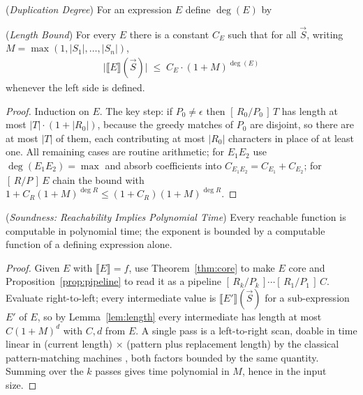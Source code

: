 \documentclass[runningheads,envcountsect]{llncs}
\begin{document}
\begin{definition}
    (\emph{Duplication Degree})
    \label{def:deg}
    For an expression $E$ define $\deg(E)$ by
\end{definition}

\begin{lemma}
    (\emph{Length Bound})
    \label{lem:length}
    For every $E$ there is a constant $C_E$ such that for all $\vec S$, writing $M = \max(1, |S_1|, \dots, |S_n|)$,
    \begin{align}
        \big|\llbracket E \rrbracket(\vec S)\big| \;\le\; C_E \cdot (1+M)^{\deg(E)}
    \end{align}
    whenever the left side is defined.
\end{lemma}

\begin{proof}
    Induction on $E$. The key step: if $P_0 \neq \epsilon$ then $[\,R_0/P_0\,]\,T$ has length at most $|T| \cdot (1 + |R_0|)$, because the greedy matches of $P_0$ are disjoint, so there are at most $|T|$ of them, each contributing at most $|R_0|$ characters in place of at least one. All remaining cases are routine arithmetic; for $E_1E_2$ use $\deg(E_1E_2) = \max$ and absorb coefficients into $C_{E_1E_2} = C_{E_1} + C_{E_2}$; for $[\,R/P\,]\,E$ chain the bound with $1 + C_R(1+M)^{\deg R} \le (1 + C_R)(1+M)^{\deg R}$.
\end{proof}

\begin{theorem}
    (\emph{Soundness: Reachability Implies Polynomial Time})
    \label{thm:fp}
    Every reachable function is computable in polynomial time; the exponent is bounded by a computable function of a defining expression alone.
\end{theorem}

\begin{proof}
    Given $E$ with $\llbracket E \rrbracket = f$, use Theorem~\ref{thm:core} to make $E$ core and Proposition~\ref{prop:pipeline} to read it as a pipeline $[\,R_k/P_k\,]\cdots[\,R_1/P_1\,]\,C$. Evaluate right-to-left; every intermediate value is $\llbracket E' \rrbracket(\vec S)$ for a sub-expression $E'$ of $E$, so by Lemma~\ref{lem:length} every intermediate has length at most $C(1+M)^d$ with $C, d$ from $E$. A single pass is a left-to-right scan, doable in time linear in (current length) $\times$ (pattern plus replacement length) by the classical pattern-matching machines \cite{knuth77,aho75}, both factors bounded by the same quantity. Summing over the $k$ passes gives time polynomial in $M$, hence in the input size.
\end{proof}
\end{document}
